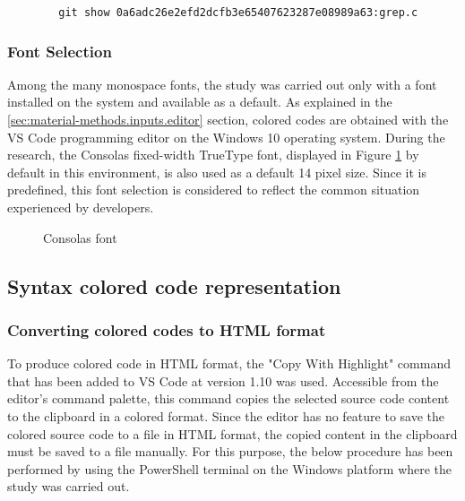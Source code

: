 \documentclass{article}
\begin{document}
\begin{verbatim}
        git show 0a6adc26e2efd2dcfb3e65407623287e08989a63:grep.c
\end{verbatim}

\subsubsection{Font Selection} \label{sec:material-methods.inputs.font}
	
Among the many monospace fonts, the study was carried out only with a font installed on the system and available as a
default. As explained in the \ref{sec:material-methods.inputs.editor} section, colored codes are obtained with the VS
Code programming editor on the Windows 10 operating system. During the research, the
Consolas\cite{microsoft2022consolas} fixed-width TrueType font, displayed in Figure \ref{fig:consolas} by default in
this environment, is also used as a default 14 pixel size. Since it is predefined, this font selection is considered to
reflect the common situation experienced by developers.

\begin{figure}[h]
  \centering
  
  \caption{Consolas font}
  \label{fig:consolas}
\end{figure}

\subsection{Syntax colored code representation}

\subsubsection{Converting colored codes to HTML format}

To produce colored code in HTML format, the "Copy With Highlight" command that has been added to VS Code at version 1.10 was used. Accessible from the editor's command palette, this command copies the selected source code content to the clipboard in a colored format. Since the editor has no feature to save the colored source code to a file in HTML format, the copied content in the clipboard must be saved to a file manually. For this purpose, the below procedure has been performed by using the PowerShell terminal on the Windows platform where the study was carried out.
\end{document}
